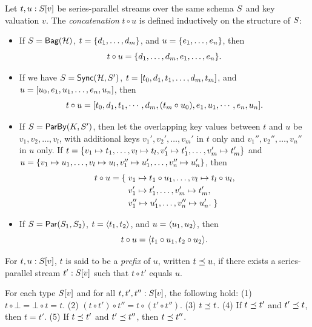 \begin{definition}
\label{def:trace-concat}
Let $t, u: \spstype{v}{\ss}$ be series-parallel streams over the same schema $\ss$ and key valuation $v$.
The  \emph{concatenation} $t \circ u$ is defined inductively on the structure of $\ss$:
\begin{itemize}
\item If $\ss = \relleaf{\mathcal{H}}$,
$t = \spsbag{d_1, \ldots, d_m}$,
and $u = \spsbag{e_1, \ldots, e_n}$,
then
\[t \circ u = \spsbag{d_1, \ldots, d_m, e_1, \ldots, e_n}.\]
\item If we have $\ss = \hier{\mathcal{H}}{\ss'}$,
$t = \spsseq{t_0, d_1, t_1, \ldots, d_m, t_m}$,
and
$u = \spsseq{u_0, e_1, u_1, \ldots, e_n, u_n}$,
then
\[t \circ u =
\spsseq{t_0, d_1, t_1, \cdots, d_m, (t_m \circ u_0), e_1, u_1, \cdots, e_n, u_n}.
\]
\item If $\ss = \keyby{K}{S'}$,
then let the overlapping key values between $t$ and $u$ be
$v_1, v_2, \ldots, v_l$,
with additional keys $v_1', v_2', \ldots, v_m'$ in $t$ only
and $v_1'', v_2'', \ldots, v_n''$ in $u$ only.
If
$t = \spsbag{\keyed{v_1}{t_1}, \ldots, \keyed{v_l}{t_l},
\keyed{v_1'}{t_1'}, \ldots, \keyed{v_m'}{t_m'}}$
and
$u = \spsbag{\keyed{v_1}{u_1}, \ldots, \keyed{v_l}{u_l},
\keyed{v_1''}{u_1'}, \ldots, \keyed{v_n''}{u_n'}}$,
then
\begin{align*}
t \circ u = \spsbagleft{}
&\keyed{v_1}{t_1 \circ u_1}, \ldots, \keyed{v_l}{t_l \circ u_l}, \\
&\keyed{v_1'}{t_1'}, \ldots, \keyed{v_m'}{t_m'}, \\
&\keyed{v_1''}{u_1'}, \ldots, \keyed{v_n''}{u_n'}.\spsbagright{}
\end{align*}
\item If $\ss = \parcomp{\ss_1}{\ss_2}$,
$t = \spspar{t_1}{t_2}$, and $u = \spspar{u_1}{u_2}$,
then
\[
t \circ u = \spspar{t_1 \circ u_1}{t_2 \circ u_2}.
\]
\end{itemize}
For $t, u: \spstype{v}{\ss}$, $t$ is said to be a {\em prefix} of $u$, written $t\prefix u$,
if there exists a series-parallel stream $t' : \spstype{v}{\ss}$ such that $t\circ t'$
equals $u$.
\end{definition}

\begin{proposition}
\label{prop:sps-concat-properties}
For each type $\spstype{v}{\ss}$ and for all $t, t', t'': \spstype{v}{\ss}$,
the following hold:
(1) $t \circ \bot = \bot \circ t = t$.
(2) $(t \circ t') \circ t'' = t \circ (t' \circ t'')$.
(3) $t \prefix t$.
(4) If $t \prefix t'$ and $t' \prefix t$, then $t = t'$.
(5) If $t \prefix t'$ and $t' \prefix t''$, then $t \prefix t''$.
\end{proposition}

